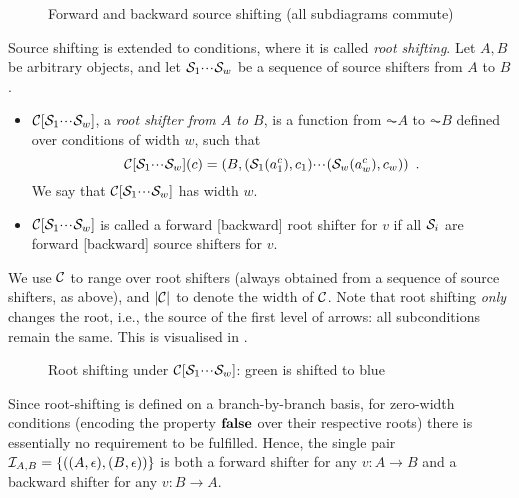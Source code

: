 \begin{figure}
\centering

\caption{Forward and backward source shifting (all subdiagrams commute)}
\end{figure}

Source shifting is extended to conditions, where it is called \emph{root shifting}. Let $A,B$ be arbitrary objects, and let $\mathcal{S}_1{\cdotp\mkern-2mu\cdotp\mkern-2mu\cdotp\mkern1mu} \mathcal{S}_w$ be a sequence of source shifters from $A$ to $B$.
%
\begin{itemize}
\item $\mathcal{C}[\mathcal{S}_1{\cdotp\mkern-2mu\cdotp\mkern-2mu\cdotp\mkern1mu} \mathcal{S}_w]$, a \emph{root shifter from $A$ to $B$}, is a function from $\AC A$ to $\AC B$ defined over conditions of width $w$, such that 
\[ \mathcal{C}[\mathcal{S}_1{\cdotp\mkern-2mu\cdotp\mkern-2mu\cdotp\mkern1mu} \mathcal{S}_w](c) = (B,(\mathcal{S}_1(a^c_1),c_1){\cdotp\mkern-2mu\cdotp\mkern-2mu\cdotp\mkern1mu} (\mathcal{S}_w(a^c_w),c_w)) \enspace.
\]
We say that $\mathcal{C}[\mathcal{S}_1{\cdotp\mkern-2mu\cdotp\mkern-2mu\cdotp\mkern1mu} \mathcal{S}_w]$ has width $w$.
\item $\mathcal{C}[\mathcal{S}_1{\cdotp\mkern-2mu\cdotp\mkern-2mu\cdotp\mkern1mu} \mathcal{S}_w]$ is called a forward [backward] root shifter for $v$ if all $\mathcal{S}_i$ are forward [backward] source shifters for $v$.
\end{itemize}
%
We use $\mathcal{C}$ to range over root shifters (always obtained from a sequence of source shifters, as above), and $|\mathcal{C}|$ to denote the width of $\mathcal{C}$. Note that root shifting \emph{only} changes the root, i.e., the source of the first level of arrows: all subconditions remain the same. This is visualised in .
%
\begin{figure}
\centering

\caption{Root shifting under $\mathcal{C}[\mathcal{S}_1{\cdotp\mkern-2mu\cdotp\mkern-2mu\cdotp\mkern1mu} \mathcal{S}_w]$: green is shifted to blue}
\end{figure}

Since root-shifting is defined on a branch-by-branch basis, for zero-width conditions (encoding the property $\textbf{false}$ over their respective roots) there is essentially no requirement to be fulfilled. Hence, the single pair $\mathcal{I}_{A,B}=\{{((A,\epsilon),(B,\epsilon))}\}$ is both a forward shifter for any $v:A\to B$ and a backward shifter for any $v:B\to A$.


